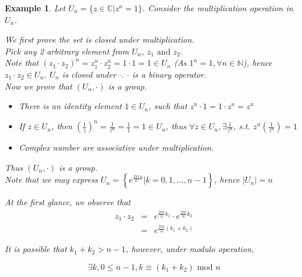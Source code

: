 \documentclass{article}
\theoremstyle{MyNonumberplain}
\theoremstyle{break}
\theoremstyle{break}
\newtheorem{example}{Example}[section]
\theoremstyle{break}
\theoremstyle{definition}
\theoremstyle{break}
\begin{document}
\begin{expbox}
    \begin{example}
        Let $U_n = \{ z \in \mathbb{C}|z^n = 1 \}$. Consider the multiplication operation in $U_n$.

        \begin{ansbox}
            We first prove the set is closed under multiplication.\\

            Pick any 2 arbitrary element from $U_n$, $z_1 \text{ and } z_2$.\\
    
            Note that $(z_1 \cdot z_2)^n = z_1^n \cdot z^n_2 = 1 \cdot 1 = 1 \in U_n$ (As
            $1^n = 1, \forall n \in \mathbb{N}$), hence $z_1 \cdot z_2 \in U_n$. $U_n$ is
            closed under $\cdot$. $\cdot$ is a binary operator.\\
    
            Now we prove that $(U_n, \cdot)$ is a group.\\
    
            \begin{itemize}
            \item There is an identity element $1 \in U_n$, such that $z^n \cdot 1 = 1
            \cdot z^n = z^n$\\
            
            \item If $z \in U_n$, then $\left( \frac{1}{z} \right)^n = \frac{1}{z^n} =
            \frac{1}{1} = 1 \in U_n$, thus $\forall z \in U_n, \exists \frac{1}{z^n}$,
            s.t. $z^n \left( \frac{1}{z^n} \right) = 1$\\
            
            \item Complex number are associative under multiplication.\\
            \end{itemize}
            Thus $(U_n, \cdot)$ is a group.\\
    
            Note that we may express $U_n = \left\{ e^{\frac{2 \pi i}{n} k} |k = 0, 1,
            \ldots, n - 1 \right\}$, hence $| U_n | = n$\\
    
            \hrulefill
    
            At the first glance, we observe that
            \begin{eqnarray*}
            z_1 \cdot z_2 & = & e^{\frac{2 \pi i}{n} k_1} \cdot e^{\frac{2 \pi i}{n}
            k_2}\\
            & = & e^{\frac{2 \pi i}{n} (k_1 + k_2)}
            \end{eqnarray*}
    
            It is possible that $k_1 + k_2 > n - 1$, however, under modulo operation,
    
            \[ \exists k, 0 \leq n - 1, k \equiv (k_1 + k_2) \text{ mod } n \]
    
        \end{ansbox}

    \end{example}
\end{expbox}
\end{document}
